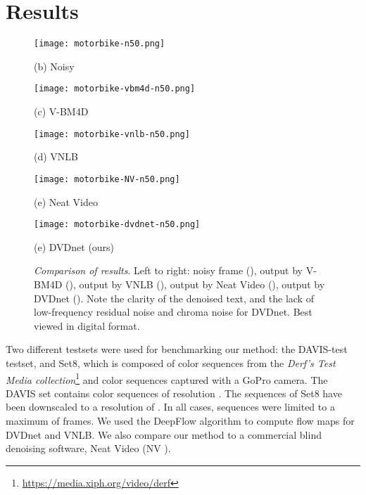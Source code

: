 \documentclass{article}
\begin{document}
	\section{Results}
	\label{sec:results}
\begin{figure*}[htb] \centering
	\begin{minipage}[b]{0.185\linewidth}
	\centering
	\centerline{\texttt{[image: motorbike-n50.png]}}
	\centerline{(b) Noisy }\medskip
	\end{minipage}
\begin{minipage}[b]{0.185\linewidth}
		\centering
		\centerline{\texttt{[image: motorbike-vbm4d-n50.png]}}
		\centerline{(c) V-BM4D}\medskip
	\end{minipage}
\begin{minipage}[b]{0.185\linewidth}
		\centering
		\centerline{\texttt{[image: motorbike-vnlb-n50.png]}}
		\centerline{(d) VNLB}\medskip
	\end{minipage}
\begin{minipage}[b]{0.185\linewidth}
		\centering
		\centerline{\texttt{[image: motorbike-NV-n50.png]}}
		\centerline{(e) Neat Video}\medskip
	\end{minipage}
\begin{minipage}[b]{0.185\linewidth}
		\centering
		\centerline{\texttt{[image: motorbike-dvdnet-n50.png]}}
		\centerline{(e) DVDnet (ours)}\medskip
	\end{minipage}
\caption{\textit{Comparison of results}. Left to right: noisy frame (), output by V-BM4D (), output by VNLB (), output by Neat Video (), output by DVDnet (). Note the clarity of the denoised text, and the lack of low-frequency residual noise and chroma noise for DVDnet. Best viewed in digital format.}
	\label{fig:results}
\end{figure*}
Two different testsets were used for benchmarking our method: the DAVIS-test testset, and Set8, which is composed of  color sequences from the \textit{Derf’s Test Media collection}\footnote{\url{https://media.xiph.org/video/derf}} and  color sequences captured with a GoPro camera. The DAVIS set contains  color sequences of resolution . The sequences of Set8 have been downscaled to a resolution of . In all cases, sequences were limited to a maximum of  frames. We used the DeepFlow algorithm to compute flow maps for DVDnet and VNLB. We also compare our method to a commercial blind denoising software, Neat Video (NV \cite{neatvideo19}).
		
\end{document}
